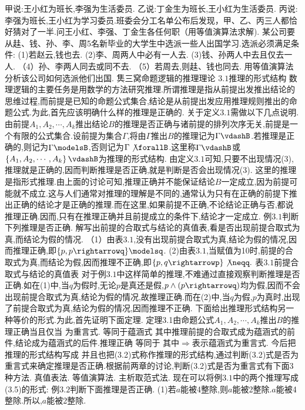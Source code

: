 {甲说:王小红为班长,李强为生活委员.
乙说:丁金生为班长,王小红为生活委员.
丙说:李强为班长,王小红为学习委员.班委会分工名单公布后发现，甲、乙、丙三人都恰好猜对了一半.问王小红、李强、丁金生各任何职（用等值演算法求解).
某公司要从䞨、钱、孙、李、周5名新毕业的大学生中选派一些人出国学习.选派必须满足条件:
(1)若赵云,钱也去.
(2)李、周两人中必有一人去.
(3)钱、孙两人中去且仅去一人.
（4）孙、李两人同去或同不去.
（5）若周去,则䞨、钱也同去.
用等值演算法分析该公司如何选派他们出国.
{䧶三窝命题逻辑的推理理论}
{$3.1$推理的形式结构}
数理逻辑的主要任务是用数学的方法研究推理.所谓推理是指从前提出发推出结论的思维过程,而前提是已知的命题公式集合,结论是从前提出发应用推理规则推出的命题公式.为此,首先应该明确什么样的推理是正确的.
关于定义$3.1$需做以下几点说明.
由前提$A_{1},A_{2},\cdots,A_{k}$推出结论$B$的推理是否正确与诸前提的排列次序无关,前提是一个有限的公式集合.设前提为集合$\Gamma$,将由$\Gamma$推出$B$的推理记为$\Gamma\vdashB$.若推理是正确的,则记为$\Gamma\modelsB$,否则记为$\Gamma\not\forallB$.这里称$\Gamma\vdashB$或$\left\{A_{1},A_{2},\cdots,A_{k}\right\}\vdashB$为推理的形式结构.
由定义$3.1$可知,只要不出现情况(3),推理就是正确的,因而判断推理是否正确,就是判断是否会出现情况(3).
这里的推理是指形式推理.由上面的讨论可知,推理正确并不能保证结论$B$一定成立,因为前提可能就不成立.这与人们通常对推理的理解是不同的,通常认为只有在正确的前提下推出正确的结论才是正确的推理.而在这里,如果前提不正确,不论结论正确与否,都说推理正确.因而,只有在推理正确并且前提成立的条件下,结论才一定成立.
例$3.1$判断下列推理是否正确.
解写出前提的合取式与结论的真值表,看是否出现前提合取式为真,而结论为假的情况.
（1）由表$3.1$,没有出现前提合取式为真,结论为假的情况,因而推理正确,即$\{p,p\rightarrowq\}\modelsq$.
(2)由表$3.1$,当赋值为10时,前提的合取式为真,而结论为假,因而推理不正确,即$\{p,q\rightarrowp\}\not\neqq.$
表$3.1$前提合取式与结论的真值表
对于例$3.1$中这样简单的推理,不难通过直接观察判断推理是否正确.如在(1)中,当$q$为假时,无论$p$是真还是假,$p\wedge(p\rightarrowq)$均为假,因而不会出现前提合取式为真,结论为假的情况,故推理正确.而在(2)中,当$q$为假,$p$为真时,出现了前提合取式为真,结论为假的情况,因而推理不正确.
下面给出推理形式结构另一种等价的形式.为此,首先证明下面定理.
定理3.1由命题公式$A_{1},A_{2},\cdots,A_{k}$推出$B$的推理正确当且仅当
为重言式.
等同于蕴涵式
其中推理前提的合取式成为蕴涵式的前件,结论成为蕴涵式的后件.推理正确
等同于
其中$\Rightarrow$表示蕴涵式为重言式.
今后把推理的形式结构写成
并且也把(3.2)式称作推理的形式结构,通过判断(3.2)式是否为重言式来确定推理是否正确.根据前两章的讨论,判断(3.2)式是否为重言式有下面3种方法.
真值表法.
等值演算法.
主析取范式法.
现在可以将例$3.1$中的两个推理写成(3.5)的形式:
例$3.2$判断下面推理是否正确.
(1)若$a$能被4整除,则$a$能被2整除.$a$能被4整除.所以,$a$能被2整除.
}
